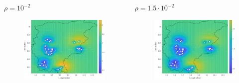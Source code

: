 \begin{frame}
	
	\begin{columns}[T]
		\begin{column}[t]{0.48\linewidth}
			\centering
			$\rho = 10^{-2}$
			\begin{figure}
				\includegraphics[width=\textwidth]{../Tesi/Immagini/2. Nuovo modello/Mappa potenziale, rho = 0.01}
			\end{figure}
		\end{column}
		\begin{column}[t]{0.48\linewidth}
			\centering
			$\rho = 1.5\cdot 10^{-2}$
			\begin{figure}
				\includegraphics[width=\textwidth]{../Tesi/Immagini/2. Nuovo modello/Mappa potenziale, rho = 0.015}
			\end{figure}
		\end{column}
	\end{columns}
	
\end{frame}